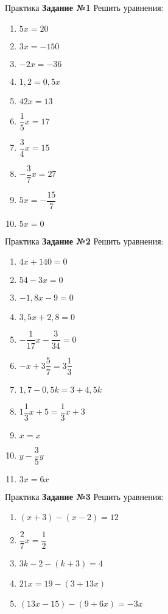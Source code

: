 \documentclass[12pt, aspectratio=169]{beamer}
\begin{document}
\begin{frame}{Практика}
	\textbf{Задание №1} Решить уравнения:
	\begin{multicols}{3}
		\begin{enumerate}
			\item $5x=20$
			\item $3x=-150$
			\item $-2x=-36$
			\item $1,2=0,5x$
			\item $42x=13$
			\item $\dfrac{1}{5}x=17$
			\item $\dfrac{3}{4}x=15$
			\item $-\dfrac{3}{7}x=27$
			\item $5x=-\dfrac{15}{7}$
			\item $5x=0$
		\end{enumerate}
	\end{multicols}
\end{frame}

\begin{frame}{Практика}
	\textbf{Задание №2} Решить уравнения:
	\begin{multicols}{2}
		\begin{enumerate}
			\item $4x+140=0$
			\item $54-3x=0$
			\item $-1,8x-9=0$
			\item $3,5x+2,8=0$
			\item $-\dfrac{1}{17}x-\dfrac{3}{34}=0$
			\item $-x+3\dfrac{5}{7}=3\dfrac{1}{3}$
			\item $1,7-0,5k=3+4,5k$
			\item $1\dfrac{1}{3}x+5=\dfrac{1}{3}x+3$
			\item $x=x$
			\item $y-\dfrac{3}{5}y$
			\item $3x=6x$
		\end{enumerate}
	\end{multicols}
\end{frame}

\begin{frame}{Практика}
\textbf{Задание №3} Решить уравнения:
\begin{multicols}{2}
	\begin{enumerate}
		\item $(x+3)-(x-2)=12$
		\item $\dfrac{2}{7}x=\dfrac{1}{2}$
		\item $3k-2-(k+3)=4$
		\item $21x=19-(3+13x)$
		\item $(13x-15)-(9+6x)=-3x$
	\end{enumerate}
\end{multicols}
\end{frame}
\end{document}
